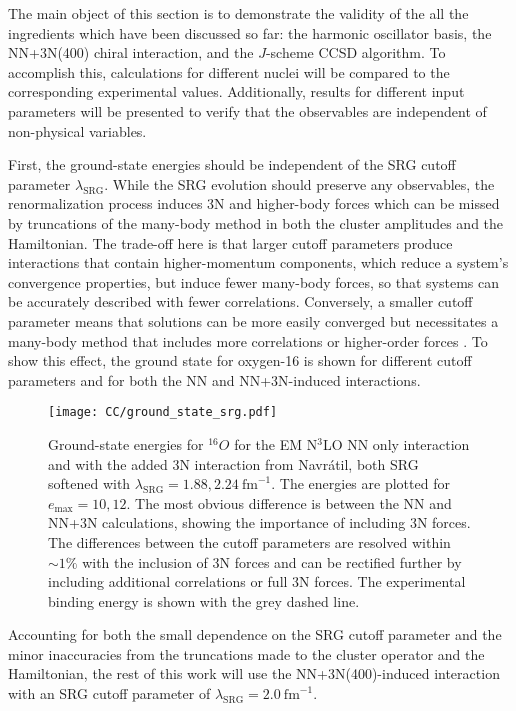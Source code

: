 \documentclass[thesis.tex]{subfiles}
\begin{document}
The main object of this section is to demonstrate the validity of the all the ingredients which have been discussed so far: the harmonic oscillator basis, the NN+3N(400) chiral interaction, and the $J$-scheme CCSD algorithm.  To accomplish this, calculations for different nuclei will be compared to the corresponding experimental values.  Additionally, results for different input parameters will be presented to verify that the observables are independent of non-physical variables.

First, the ground-state energies should be independent of the SRG cutoff parameter $\lambda_{\mathrm{SRG}}$.  While the SRG evolution should preserve any observables, the renormalization process induces 3N and higher-body forces which can be missed by truncations of the many-body method in both the cluster amplitudes and the Hamiltonian.  The trade-off here is that larger cutoff parameters produce interactions that contain higher-momentum components, which reduce a system's convergence properties, but induce fewer many-body forces, so that systems can be accurately described with fewer correlations.  Conversely, a smaller cutoff parameter means that solutions can be more easily converged but necessitates a many-body method that includes more correlations or higher-order forces \cite{ROTH2012}.  To show this effect, the ground state for oxygen-16 is shown for different cutoff parameters and for both the NN and NN+3N-induced interactions.  
\begin{figure}[h!]
  \centering
  \texttt{[image: CC/ground\_state\_srg.pdf]}
  \caption{Ground-state energies for ${}^{16}O$ for the EM N$^{3}$LO NN only interaction and with the added 3N interaction from Navr\'{a}til, both SRG softened with $\lambda_{\mathrm{SRG}}=1.88,2.24\ \mathrm{fm}^{-1}$.  The energies are plotted for $e_\mathrm{max}=10,12$.  The most obvious difference is between the NN and NN+3N calculations, showing the importance of including 3N forces.  The differences between the cutoff parameters are resolved within $\sim 1\%$ with the inclusion of 3N forces and can be rectified further by including additional correlations or full 3N forces.  The experimental binding energy is shown with the grey dashed line.}
  \label{fig:Ground_State_srg}
\end{figure}
Accounting for both the small dependence on the SRG cutoff parameter and the minor inaccuracies from the truncations made to the cluster operator and the Hamiltonian, the rest of this work will use the NN+3N(400)-induced interaction with an SRG cutoff parameter of $\lambda_{\mathrm{SRG}}=2.0\ \mathrm{fm}^{-1}$.
\end{document}

